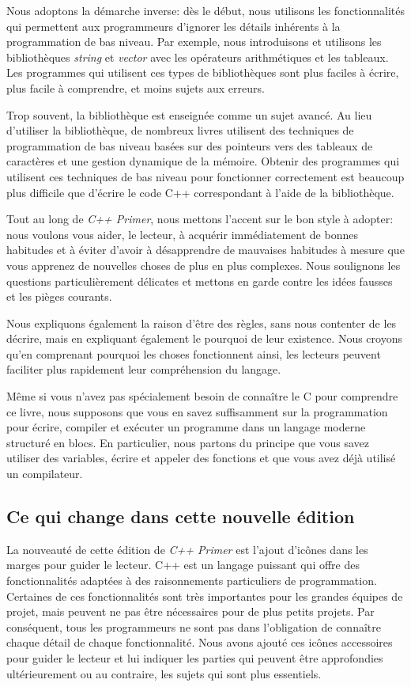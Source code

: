 \documentclass[a4paper,18pt,twoside]{report}
\begin{document}
Nous adoptons la démarche inverse: dès le début, nous utilisons les fonctionnalités qui permettent aux programmeurs d'ignorer les détails inhérents à la programmation de bas niveau. Par exemple, nous introduisons et utilisons les bibliothèques \textit{string} et \textit{vector} avec les opérateurs arithmétiques et les tableaux. Les programmes qui utilisent ces types de bibliothèques sont plus faciles à écrire, plus facile à comprendre, et moins sujets aux erreurs.

Trop souvent, la bibliothèque est enseignée comme un sujet avancé. Au lieu d'utiliser la bibliothèque, de nombreux livres utilisent des techniques de programmation de bas niveau basées sur des pointeurs vers des tableaux de caractères et une gestion dynamique de la mémoire. Obtenir des programmes qui utilisent ces techniques de bas niveau pour fonctionner correctement est beaucoup plus difficile que d'écrire le code C++ correspondant à l'aide de la bibliothèque.

Tout au long de \textit{C++ Primer}, nous mettons l'accent sur le bon style à adopter: nous voulons vous aider, le lecteur, à acquérir immédiatement de bonnes habitudes et à éviter d'avoir à désapprendre de mauvaises habitudes à mesure que vous apprenez de nouvelles choses de plus en plus complexes. Nous soulignons les questions particulièrement délicates et mettons en garde contre les idées fausses et les pièges courants.

Nous expliquons également la raison d'être des règles, sans nous contenter de les décrire, mais en expliquant également le pourquoi de leur existence. Nous croyons qu'en comprenant pourquoi les choses fonctionnent ainsi, les lecteurs peuvent faciliter plus rapidement leur compréhension du langage.

Même si vous n'avez pas spécialement besoin de connaître le C pour comprendre ce livre, nous supposons que vous en savez suffisamment sur la programmation pour écrire, compiler et exécuter un programme dans un langage moderne structuré en blocs. En particulier, nous partons du principe que vous savez utiliser des variables, écrire et appeler des fonctions et que vous avez déjà utilisé un compilateur. 

\subsection{Ce qui change dans cette nouvelle édition}
La nouveauté de cette édition de \textit{C++ Primer} est l'ajout d'icônes dans les marges pour guider le lecteur. C++ est un langage puissant qui offre des fonctionnalités adaptées à des raisonnements particuliers de programmation. Certaines de ces fonctionnalités sont très importantes pour les grandes équipes de projet, mais peuvent ne pas être nécessaires pour de plus petits projets. Par conséquent, tous les programmeurs ne sont pas dans l'obligation de connaître chaque détail de chaque fonctionnalité. Nous avons ajouté ces icônes accessoires pour guider le lecteur et lui indiquer les parties qui peuvent être approfondies ultérieurement ou au contraire, les sujets qui sont plus essentiels.
\end{document}
